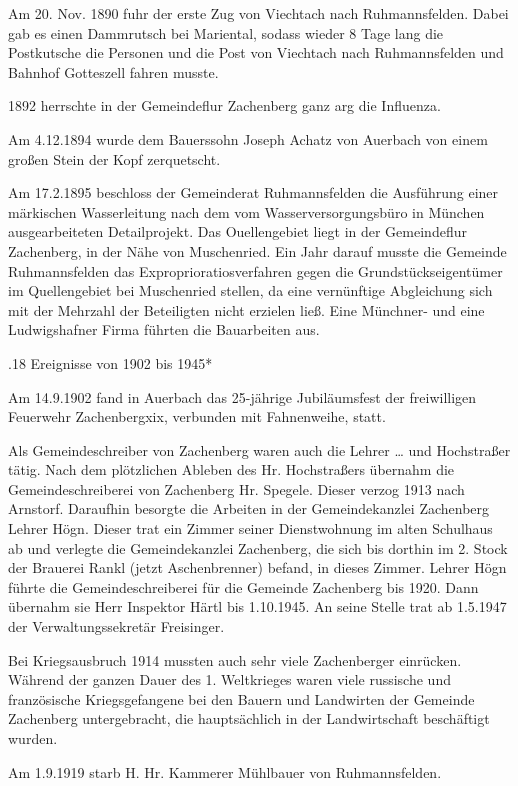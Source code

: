 Am 20. Nov. 1890 fuhr der erste Zug von Viechtach nach Ruhmannsfelden. Dabei gab
es einen Dammrutsch bei Mariental, sodass wieder 8 Tage lang die Postkutsche die
Personen und die Post von Viechtach nach Ruhmannsfelden und Bahnhof Gotteszell
fahren musste.

1892 herrschte in der Gemeindeflur Zachenberg ganz arg die Influenza.

Am 4.12.1894 wurde dem Bauerssohn Joseph Achatz von Auerbach von einem großen
Stein der Kopf zerquetscht.

Am 17.2.1895 beschloss der Gemeinderat Ruhmannsfelden die Ausführung einer
märkischen Wasserleitung nach dem vom Wasserversorgungsbüro in München
ausgearbeiteten Detailprojekt. Das Ouellengebiet liegt in der Gemeindeflur
Zachenberg, in der Nähe von Muschenried. Ein Jahr darauf musste die Gemeinde
Ruhmannsfelden das Exproprioratiosverfahren gegen die Grundstückseigentümer im
Quellengebiet bei Muschenried stellen, da eine vernünftige Abgleichung sich mit
der Mehrzahl der Beteiligten nicht erzielen ließ. Eine Münchner- und eine
Ludwigshafner Firma führten die Bauarbeiten aus.

.18 Ereignisse von 1902 bis 1945*

Am 14.9.1902 fand in Auerbach das 25-jährige Jubiläumsfest der freiwilligen
Feuerwehr Zachenbergxix, verbunden mit Fahnenweihe, statt.

Als Gemeindeschreiber von Zachenberg waren auch die Lehrer … und Hochstraßer
tätig. Nach dem plötzlichen Ableben des Hr. Hochstraßers übernahm die
Gemeindeschreiberei von Zachenberg Hr. Spegele. Dieser verzog 1913 nach
Arnstorf. Daraufhin besorgte die Arbeiten in der Gemeindekanzlei Zachenberg
Lehrer Högn. Dieser trat ein Zimmer seiner Dienstwohnung im alten Schulhaus ab
und verlegte die Gemeindekanzlei Zachenberg, die sich bis dorthin im 2. Stock
der Brauerei Rankl (jetzt Aschenbrenner) befand, in dieses Zimmer. Lehrer Högn
führte die Gemeindeschreiberei für die Gemeinde Zachenberg bis 1920. Dann
übernahm sie Herr Inspektor Härtl bis 1.10.1945. An seine Stelle trat ab
1.5.1947 der Verwaltungssekretär Freisinger.

Bei Kriegsausbruch 1914 mussten auch sehr viele Zachenberger einrücken. Während
der ganzen Dauer des 1. Weltkrieges waren viele russische und französische
Kriegsgefangene bei den Bauern und Landwirten der Gemeinde Zachenberg
untergebracht, die hauptsächlich in der Landwirtschaft beschäftigt wurden.

Am 1.9.1919 starb H. Hr. Kammerer Mühlbauer von Ruhmannsfelden.

